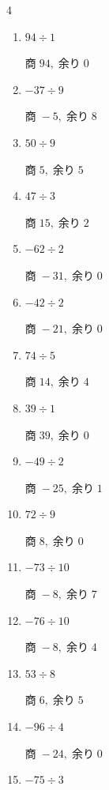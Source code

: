 \begin{multicols}{4}
\begin{enumerate}
  \item $94 \div 1$

        $商\; 94,\; 余り\; 0$

  \item $-37 \div 9$

        $商\; -5,\; 余り\; 8$

  \item $50 \div 9$

        $商\; 5,\; 余り\; 5$

  \item $47 \div 3$

        $商\; 15,\; 余り\; 2$

\columnbreak %

\resetques

  \item $-62 \div 2$

        $商\; -31,\; 余り\; 0$

  \item $-42 \div 2$

        $商\; -21,\; 余り\; 0$

  \item $74 \div 5$

        $商\; 14,\; 余り\; 4$

  \item $39 \div 1$

        $商\; 39,\; 余り\; 0$

  \item $-49 \div 2$

        $商\; -25,\; 余り\; 1$

  \item $72 \div 9$

        $商\; 8,\; 余り\; 0$

  \item $-73 \div 10$

        $商\; -8,\; 余り\; 7$

  \item $-76 \div 10$

        $商\; -8,\; 余り\; 4$

  \item $53 \div 8$

        $商\; 6,\; 余り\; 5$

  \item $-96 \div 4$

        $商\; -24,\; 余り\; 0$

  \item $-75 \div 3$


\end{enumerate}
\end{multicols}
